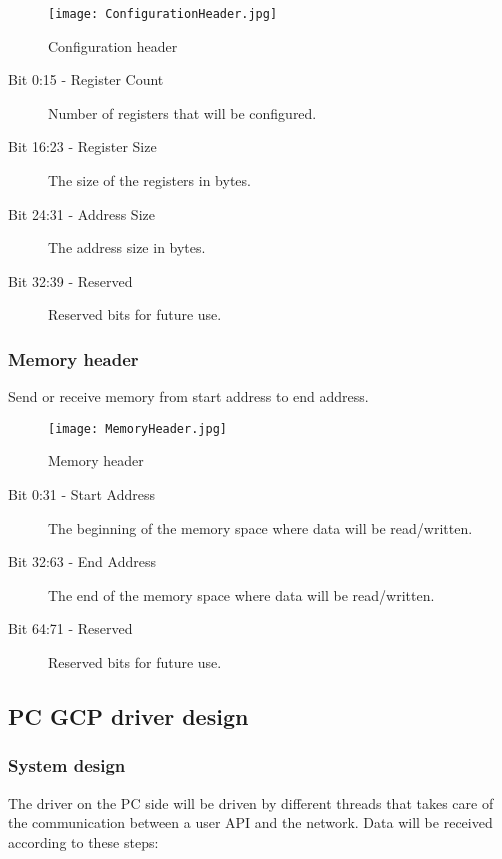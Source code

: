 \begin{figure}
\centering
\texttt{[image: ConfigurationHeader.jpg]}
\caption{Configuration header}
\label{fig:ConfigurationHeader}
\end{figure}

\begin{description}
\item [Bit 0:15 - Register Count] Number of registers that will be configured.
\item [Bit 16:23 - Register Size] The size of the registers in bytes.
\item [Bit 24:31 - Address Size] The address size in bytes.
\item [Bit 32:39 - Reserved] Reserved bits for future use.
\end{description}

\subsubsection*{Memory header}

Send or receive memory from start address to end address.

\begin{figure}
\centering
\texttt{[image: MemoryHeader.jpg]}
\caption{Memory header}
\label{fig:MemoryHeader}
\end{figure}

\begin{description}
\item [Bit 0:31 - Start Address] The beginning of the memory space where data will be read/written.
\item [Bit 32:63 - End Address] The end of the memory space where data will be read/written.
\item [Bit 64:71 - Reserved] Reserved bits for future use.
\end{description}

\subsection{PC GCP driver design}

\subsubsection{System design}

The driver on the PC side will be driven by different threads that takes care of the communication between a user API and the network. Data will be received according to these steps:


